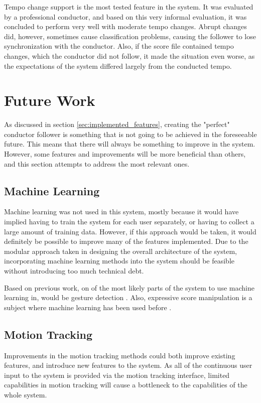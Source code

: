 Tempo change support is the most tested feature in the system.
It was evaluated by a professional conductor,
and based on this very informal evaluation,
it was concluded to perform very well with
moderate tempo changes.
Abrupt changes did, however,
sometimes cause classification problems,
causing the follower to lose synchronization with the conductor.
Also, if the score file contained tempo changes,
which the conductor did not follow,
it made the situation even worse,
as the expectations of the system differed
largely from the conducted tempo.

\section{Future Work}
\label{sec:future_work}

As discussed in section \ref{sec:implemented_features},
creating the "perfect" conductor follower
is something that is not going to be achieved
in the foreseeable future.
This means that there will always be
something to improve in the system.
However, some features and improvements
will be more beneficial than others,
and this section attempts to address
the most relevant ones.

\subsection{Machine Learning}

Machine learning was not used in this system,
mostly because it would have implied having
to train the system for each user separately,
or having to collect a large amount of training data.
However, if this approach would be taken,
it would definitely be possible to improve
many of the features implemented.
Due to the modular approach taken
in designing the overall architecture of the system,
incorporating machine learning methods into the system
should be feasible without introducing too much technical debt.

Based on previous work,
on of the most likely parts of the system
to use machine learning in,
would be gesture detection \cite{Fabiani2012}.
Also, expressive score manipulation 
is a subject where machine learning
has been used before \cite{Kirke2012}.

\subsection{Motion Tracking}

Improvements in the motion tracking methods
could both improve existing features,
and introduce new features to the system.
As all of the continuous user input to the system 
is provided via the motion tracking interface,
limited capabilities in motion tracking
will cause a bottleneck to the capabilities of the whole system.

